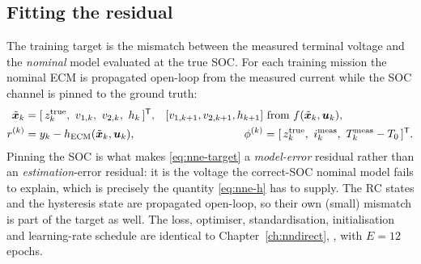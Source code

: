 \subsection{Fitting the residual}
\label{sec:nne-res}
The training target is the mismatch between the measured terminal voltage and the \emph{nominal}
model evaluated at the true SOC.  For each training mission the nominal ECM is propagated
open-loop from the measured current while the SOC channel is pinned to the ground truth:
\begin{align}
\tilde\vx_k &= [\,z^{\text{true}}_k,\ v_{1,k},\ v_{2,k},\ h_k\,]^\T, &
[v_{1,k+1}, v_{2,k+1}, h_{k+1}] &\text{ from } f(\tilde\vx_k, \vu_k), \label{eq:nne-prop}\\
r^{(k)} &= y_k - h_{\mathrm{ECM}}(\tilde\vx_k, \vu_k), &
\phi^{(k)} &= [\, z^{\text{true}}_k,\ i^{\text{meas}}_k,\ T^{\text{meas}}_k - T_0\,]^\T.
\label{eq:nne-target}
\end{align}
Pinning the SOC is what makes \cref{eq:nne-target} a \emph{model-error} residual rather than an
\emph{estimation}-error residual: it is the voltage the correct-SOC nominal model fails to explain,
which is precisely the quantity \cref{eq:nne-h} has to supply.  The RC states and the hysteresis
state are propagated open-loop, so their own (small) mismatch is part of the target as well.  The
loss, optimiser, standardisation, initialisation and learning-rate schedule are identical to
Chapter~\ref{ch:nndirect}, , with $E = 12$ epochs.

